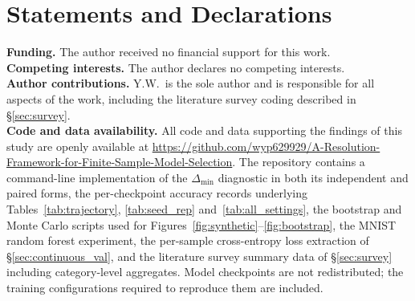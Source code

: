 \documentclass[pdflatex,sn-mathphys-ay,oneside]{sn-jnl}
\theoremstyle{thmstylethree}
\begin{document}
\section*{Statements and Declarations}

\noindent
\textbf{Funding.} \quad The author received no financial support for this work.\\
\textbf{Competing interests.} \quad The author declares no competing interests.\\
\textbf{Author contributions.} \quad Y.W.\ is the sole author and is responsible for all aspects of the work, including the literature survey coding described in \S\ref{sec:survey}.\\
\textbf{Code and data availability.} \quad All code and data supporting the findings of this study are openly available at \url{https://github.com/wyp629929/A-Resolution-Framework-for-Finite-Sample-Model-Selection}. The repository contains a command-line implementation of the $\Delta_{\min}$ diagnostic in both its independent and paired forms, the per-checkpoint accuracy records underlying Tables~\ref{tab:trajectory}, \ref{tab:seed_rep} and~\ref{tab:all_settings}, the bootstrap and Monte Carlo scripts used for Figures~\ref{fig:synthetic}--\ref{fig:bootstrap}, the MNIST random forest experiment, the per-sample cross-entropy loss extraction of \S\ref{sec:continuous_val}, and the literature survey summary data of \S\ref{sec:survey} including category-level aggregates. Model checkpoints are not redistributed; the training configurations required to reproduce them are included.


\end{document}

